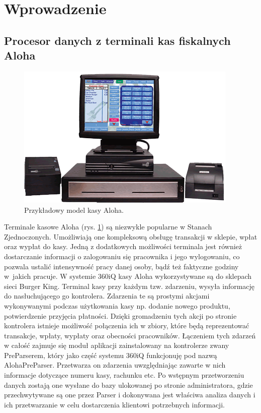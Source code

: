 \documentclass[a4paper]{book}
\begin{document}
\section{Wprowadzenie}
\subsection{Procesor danych z terminali kas fiskalnych Aloha}
\begin{figure}[t]
	\centering
	\includegraphics[width=\textwidth]{./img/aloha_pos.png}
	\caption{Przykładowy model kasy Aloha.}
	\label{fig:aloha_pos}
\end{figure}
Terminale kasowe Aloha (rys. \ref{fig:aloha_pos}) są niezwykle popularne w Stanach Zjednoczonych. Umożliwiają one kompleksową obsługę transakcji w sklepie, wpłat oraz wypłat do kasy. Jedną z dodatkowych możliwości terminala jest również dostarczanie informacji o zalogowaniu się pracownika i jego wylogowaniu, co pozwala ustalić intensywność pracy danej osoby, bądź też faktyczne godziny w~jakich pracuje. W systemie 360iQ kasy Aloha wykorzystywane są do sklepach sieci Burger King. Terminal kasy przy każdym tzw. zdarzeniu, wysyła informację do nasłuchującego go kontrolera. Zdarzenia te są prostymi akcjami wykonywanymi podczas użytkowania kasy np. dodanie nowego produktu, potwierdzenie przyjęcia płatności. Dzięki gromadzeniu tych akcji po stronie kontrolera istnieje możliwość połączenia ich w zbiory, które będą reprezentować transakcje, wpłaty, wypłaty oraz obecności pracowników. Łączeniem tych zdarzeń w całość zajmuje się moduł aplikacji zainstalowany na kontrolerze zwany PreParserem, który jako część systemu 360iQ funkcjonuję pod nazwą AlohaPreParser. Przetwarza on zdarzenia uwzględniając zawarte w nich informacje dotyczące numeru kasy, rachunku etc.
Po wstępnym przetworzeniu danych zostają one wysłane do bazy ulokowanej po stronie administratora, gdzie przechwytywane są one przez Parser i dokonywana jest właściwa analiza danych i ich przetwarzanie w celu dostarczenia klientowi potrzebnych informacji. 
\newpage
\end{document}

